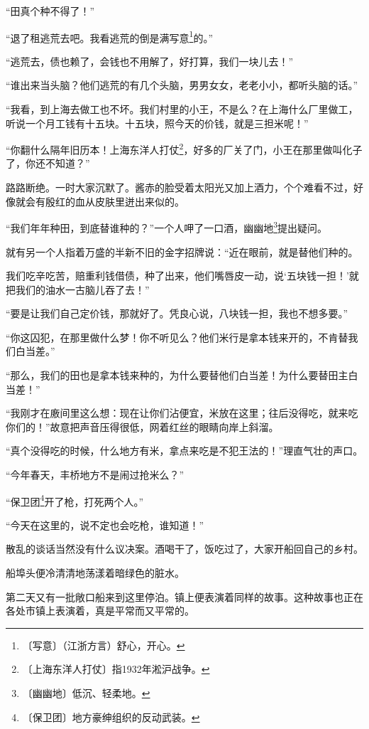 \documentclass[12pt,UTF-8,openany]{ctexbook}
\begin{document}
\begin{normalsize}
    “田真个种不得了！”
    
    “退了租逃荒去吧。我看逃荒的倒是满写意\footnote{〔写意〕（江浙方言）舒心，开心。}的。”
    
    “逃荒去，债也赖了，会钱也不用解了，好打算，我们一块儿去！”
    
    “谁出来当头脑？他们逃荒的有几个头脑，男男女女，老老小小，都听头脑的话。”
    
    “我看，到上海去做工也不坏。我们村里的小王，不是么？在上海什么厂里做工，听说一个月工钱有十五块。十五块，照今天的价钱，就是三担米呢！”
    
    “你翻什么隔年旧历本！上海东洋人打仗\footnote{〔上海东洋人打仗〕指1932年淞沪战争。}，好多的厂关了门，小王在那里做叫化子了，你还不知道？”
    
    路路断绝。一时大家沉默了。酱赤的脸受着太阳光又加上酒力，个个难看不过，好像就会有殷红的血从皮肤里迸出来似的。
    
    “我们年年种田，到底替谁种的？”一个人呷了一口酒，幽幽地\footnote{〔幽幽地〕低沉、轻柔地。}提出疑问。
    
    就有另一个人指着万盛的半新不旧的金字招牌说：“近在眼前，就是替他们种的。
    
    我们吃辛吃苦，赔重利钱借债，种了出来，他们嘴唇皮一动，说‘五块钱一担！’就把我们的油水一古脑儿吞了去！”
    
    “要是让我们自己定价钱，那就好了。凭良心说，八块钱一担，我也不想多要。”
    
    “你这囚犯，在那里做什么梦！你不听见么？他们米行是拿本钱来开的，不肯替我们白当差。”
    
    “那么，我们的田也是拿本钱来种的，为什么要替他们白当差！为什么要替田主白当差！”
    
    “我刚才在廒间里这么想：现在让你们沾便宜，米放在这里；往后没得吃，就来吃你们的！”故意把声音压得很低，网着红丝的眼睛向岸上斜溜。
    
    “真个没得吃的时候，什么地方有米，拿点来吃是不犯王法的！”理直气壮的声口。
    
    “今年春天，丰桥地方不是闹过抢米么？”
    
    “保卫团\footnote{〔保卫团〕地方豪绅组织的反动武装。}开了枪，打死两个人。”
    
    “今天在这里的，说不定也会吃枪，谁知道！”
    
    散乱的谈话当然没有什么议决案。酒喝干了，饭吃过了，大家开船回自己的乡村。
    
    船埠头便冷清清地荡漾着暗绿色的脏水。
    
    第二天又有一批敞口船来到这里停泊。镇上便表演着同样的故事。这种故事也正在各处市镇上表演着，真是平常而又平常的。
    
\end{normalsize}
\end{document}
